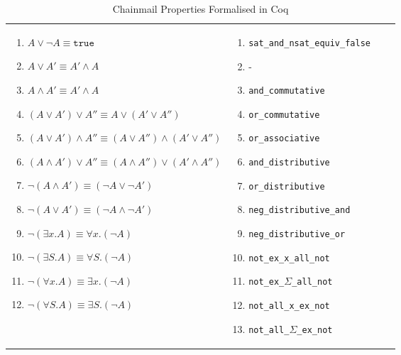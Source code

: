 \begin{table}
\begin{tabular}{|l|l|l|l|}
{\begin{enumerate}[label={(\arabic*)}]
            \item $A \vee \neg A \equiv \texttt{true}$
            \item $A \vee A' \equiv A' \wedge A$
            \item $A \wedge A' \equiv A' \wedge A$
            \item $(A \vee A') \vee A'' \equiv A \vee (A' \vee A'')$
            \item $(A \vee A') \wedge A'' \equiv (A \vee A'') \wedge (A' \vee A'')$
            \item $(A \wedge A') \vee A'' \equiv (A \wedge A'') \vee (A' \wedge A'')$
            \item $\neg (A \wedge A') \equiv (\neg A \vee \neg A')$
            \item $\neg (A \vee A') \equiv (\neg A \wedge \neg A')$
            \item $\neg (\exists x.A) \equiv \forall x. (\neg A)$
            \item $\neg (\exists S.A) \equiv \forall S. (\neg A)$
            \item $\neg (\forall x.A) \equiv \exists x. (\neg A)$
            \item $\neg (\forall S.A) \equiv \exists S. (\neg A)$
        \end{enumerate}}
        & 
\parbox{.45\textwidth}{\scriptsize\begin{enumerate}[label={(\arabic*)}]
            \item \texttt{sat\_and\_nsat\_equiv\_false}
            \item -
            \item \texttt{and\_commutative}
            \item \texttt{or\_commutative}
            \item \texttt{or\_associative}
            \item \texttt{and\_distributive}
            \item \texttt{or\_distributive}
            \item \texttt{neg\_distributive\_and}
            \item \texttt{neg\_distributive\_or}
            \item \texttt{not\_ex\_x\_all\_not}
            \item \texttt{not\_ex\_$\Sigma$\_all\_not}
            \item \texttt{not\_all\_x\_ex\_not}
            \item \texttt{not\_all\_$\Sigma$\_ex\_not}
        \end{enumerate}}
\\
\hline
  \end{tabular}
  \caption{Chainmail Properties Formalised in Coq}
  \label{Coq}
\end{table}

